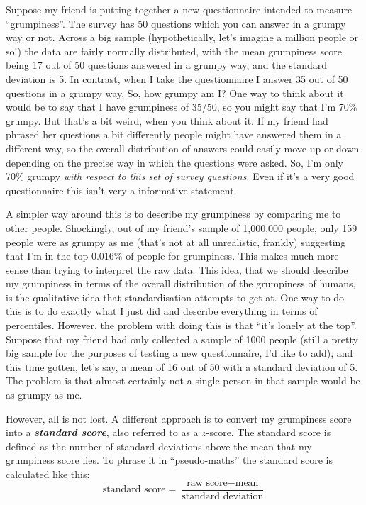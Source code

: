 \documentclass[
]{book}
\begin{document}
Suppose my friend is putting together a new questionnaire intended to measure ``grumpiness''. The survey has 50 questions which you can answer in a grumpy way or not. Across a big sample (hypothetically, let's imagine a million people or so!) the data are fairly normally distributed, with the mean grumpiness score being 17 out of 50 questions answered in a grumpy way, and the standard deviation is 5. In contrast, when I take the questionnaire I answer 35 out of 50 questions in a grumpy way. So, how grumpy am I? One way to think about it would be to say that I have grumpiness of 35/50, so you might say that I'm 70\% grumpy. But that's a bit weird, when you think about it. If my friend had phrased her questions a bit differently people might have answered them in a different way, so the overall distribution of answers could easily move up or down depending on the precise way in which the questions were asked. So, I'm only 70\% grumpy \emph{with respect to this set of survey questions}. Even if it's a very good questionnaire this isn't very a informative statement.

A simpler way around this is to describe my grumpiness by comparing me to other people. Shockingly, out of my friend's sample of 1,000,000 people, only 159 people were as grumpy as me (that's not at all unrealistic, frankly) suggesting that I'm in the top 0.016\% of people for grumpiness. This makes much more sense than trying to interpret the raw data. This idea, that we should describe my grumpiness in terms of the overall distribution of the grumpiness of humans, is the qualitative idea that standardisation attempts to get at. One way to do this is to do exactly what I just did and describe everything in terms of percentiles. However, the problem with doing this is that ``it's lonely at the top''. Suppose that my friend had only collected a sample of 1000 people (still a pretty big sample for the purposes of testing a new questionnaire, I'd like to add), and this time gotten, let's say, a mean of 16 out of 50 with a standard deviation of 5. The problem is that almost certainly not a single person in that sample would be as grumpy as me.

However, all is not lost. A different approach is to convert my grumpiness score into a \textbf{\emph{standard score}}, also referred to as a \(z\)-score. The standard score is defined as the number of standard deviations above the mean that my grumpiness score lies. To phrase it in ``pseudo-maths'' the standard score is calculated like this:
\[
\mbox{standard score} = \frac{\mbox{raw score} - \mbox{mean}}{\mbox{standard deviation}}
\]
\end{document}
